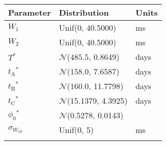 \begin{tabular}{lll} \hhline{===}
        Parameter & Distribution &  Units\\ \hline
$W_{1}$$^{}$ & Unif(0, 40.5000) & ms\\
$W_{2}$$^{}$ & Unif(0, 40.5000) & ms\\
$T$$^{*}$ & $\mathcal{N}$($485.5$, 0.8649) & days\\
$t_\mathrm{A}$$^{*}$ & $\mathcal{N}$($158.0$, 7.6587) & days\\
$t_\mathrm{B}$$^{*}$ & $\mathcal{N}$($160.0$, 11.7798) & days\\
$t_\mathrm{C}$$^{*}$ & $\mathcal{N}$(15.1379, 4.3925) & days\\
$\phi_{0}$$^{*}$ & $\mathcal{N}$(0.5278, 0.0143) & \\
$\sigma_{W_{10}}$$^{}$ & Unif(0, 5) & ms\\
\hhline{===}
\end{tabular}
